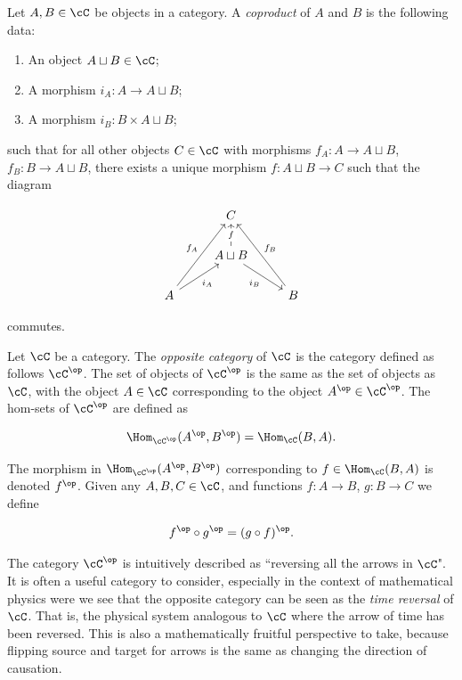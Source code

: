 \begin{defn}[Coproduct]\label{coproduct-definition} Let $A,B\in \cC$ be objects in a category. A {\em coproduct} of $A$ and $B$ is the following data:

\begin{enumerate}
\item An object $A\sqcup B\in \cC$;
\item A morphism $i_A:A\to A\sqcup B$;
\item A morphism $i_B:B\times A\sqcup B$;
\end{enumerate}

such that for all other objects $C\in \cC$ with morphisms $f_A:A\to A\sqcup B$, $f_B:B\to A\sqcup B$, there exists a unique morphism $f:A\sqcup B\to C$ such that the diagram

\[\begin{tikzcd}
	& C \\
	& {A\sqcup B} \\
	A && B
	\arrow["f"{description}, from=2-2, to=1-2]
	\arrow["{i_B}"', from=2-2, to=3-3]
	\arrow["{f_A}", from=3-1, to=1-2]
	\arrow["{i_A}"', from=3-1, to=2-2]
	\arrow["{f_B}"', from=3-3, to=1-2]
\end{tikzcd}\]

commutes.


\end{defn}

\begin{defn} Let $\cC$ be a category. The {\em opposite category} of $\cC$ is the category defined as follows $\cC^{\op}$. The set of objects of $\cC^{\op}$ is the same as the set of objects as $\cC$, with the object $A\in \cC$ corresponding to the object $A^{\op}\in \cC^{\op}$. The hom-sets of $\cC^{\op}$ are defined as

$$\Hom_{\cC^{\op}}(A^{\op},B^{\op})=\Hom_{\cC}(B,A).$$

The morphism in $\Hom_{\cC^{\op}}(A^{\op},B^{\op})$ corresponding to $f\in \Hom_{\cC}(B,A)$ is denoted $f^{\op}$. Given any $A,B,C\in \cC$, and functions $f:A\to B$, $g:B\to C$ we define

$$f^{\op}\circ g^{\op}=(g\circ f)^{\op}.$$
\end{defn}

\begin{rem} The category $\cC^{\op}$ is intuitively described as ``reversing all the arrows in $\cC$". It is often a useful category to consider, especially in the context of mathematical physics were we see that the opposite category can be seen as the {\em time reversal} of $\cC$. That is, the physical system analogous to $\cC$ where the arrow of time has been reversed. This is also a mathematically fruitful perspective to take, because flipping source and target for arrows is the same as changing the direction of causation.
\end{rem}

